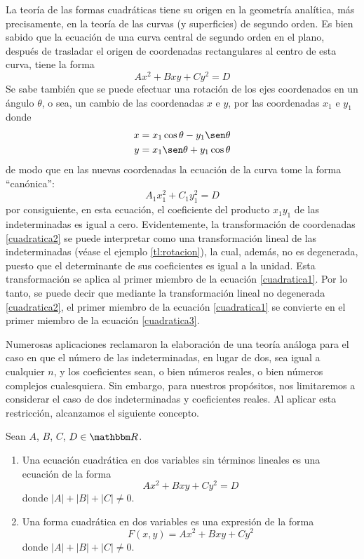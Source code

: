 La teoría de las formas cuadráticas tiene su origen en la geometría analítica, más precisamente, en la teoría de las curvas (y superficies) de segundo orden. Es bien sabido que la ecuación de una curva central de segundo orden en el plano, después de trasladar el origen de coordenadas rectangulares al centro de esta curva, tiene la forma
\begin{equation}
    Ax^2 + Bxy + Cy^2 = D \label{cuadratica1}
\end{equation}
Se sabe también que se puede efectuar una rotación de los ejes coordenados en un ángulo $\theta$, o sea, un cambio de las coordenadas $x$ e $y$, por las coordenadas $x_1$ e $y_1$ donde
\begin{equation}
    \begin{aligned}
        x & = x_1 \cos \theta - y_1 \sen \theta \\
        y & = x_1 \sen \theta + y_1 \cos \theta
    \end{aligned} \label{cuadratica2}
\end{equation}
de modo que en las nuevas coordenadas la ecuación de la curva tome la forma “canónica”:
\begin{equation}
    A_1x_1^2 + C_1y_1^2 = D \label{cuadratica3}
\end{equation}
por consiguiente, en esta ecuación, el coeficiente del producto $x_1y_1$ de las indeterminadas es igual a cero. Evidentemente, la transformación de coordenadas \eqref{cuadratica2} se puede interpretar como una transformación lineal de las indeterminadas (véase el ejemplo \ref{tl:rotacion}), la cual, además, no es degenerada, puesto que el determinante de sus coeficientes es igual a la unidad. Esta transformación se aplica al primer miembro de la ecuación \eqref{cuadratica1}. Por lo tanto, se puede decir que mediante la transformación lineal no degenerada \eqref{cuadratica2}, el primer miembro de la ecuación \eqref{cuadratica1} se convierte en el primer miembro de la ecuación \eqref{cuadratica3}.

Numerosas aplicaciones reclamaron la elaboración de una teoría análoga para el caso en que el número de las indeterminadas, en lugar de dos, sea igual a cualquier $n$, y los coeficientes sean, o bien números reales, o bien números complejos cualesquiera. Sin embargo, para nuestros propósitos, nos limitaremos a considerar el caso de dos indeterminadas y coeficientes reales. Al aplicar esta restricción, alcanzamos el siguiente concepto.

\begin{definition}
    Sean $A$, $B$, $C$, $D \in \RR$.
    \begin{enumerate}[label=\roman*)]
        \item Una ecuación cuadrática en dos variables sin términos lineales es una ecuación de la forma
        $$Ax^2 + Bxy + Cy^2 = D$$
        donde $|A| + |B| + |C| \neq 0$.\newpage
        \item Una forma cuadrática en dos variables es una expresión de la forma
        $$F(x, y) = Ax^2 + Bxy + Cy^2$$
        donde $|A| + |B| + |C| \neq 0$.
    \end{enumerate}
\end{definition}

